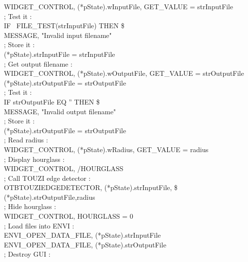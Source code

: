 \begin{scriptsize}
\indent \indent \indent WIDGET\_CONTROL, (*pState).wInputFile, GET\_VALUE = strInputFile\\
\indent \indent \indent ; Test it :\\
\indent \indent \indent IF ~FILE\_TEST(strInputFile) THEN \$\\
\indent \indent \indent \indent MESSAGE, "Invalid input filename"\\
\indent \indent \indent ; Store it :\\
\indent \indent \indent (*pState).strInputFile = strInputFile\\
\indent \indent \indent ; Get output filename :\\
\indent \indent \indent WIDGET\_CONTROL, (*pState).wOutputFile, GET\_VALUE = strOutputFile\\
\indent \indent \indent (*pState).strOutputFile = strOutputFile\\
\indent \indent \indent ; Test it :\\
\indent \indent \indent IF strOutputFile EQ '' THEN \$\\
\indent \indent \indent \indent MESSAGE, "Invalid output filename"\\
\indent \indent \indent ; Store it :\\
\indent \indent \indent (*pState).strOutputFile = strOutputFile\\
\indent \indent \indent ; Read radius :\\
\indent \indent \indent WIDGET\_CONTROL, (*pState).wRadius, GET\_VALUE = radius\\
\indent \indent \indent ; Display hourglass :\\
\indent \indent \indent WIDGET\_CONTROL, /HOURGLASS\\
\indent \indent \indent ; Call TOUZI edge detector :\\
\indent \indent \indent OTBTOUZIEDGEDETECTOR, (*pState).strInputFile, \$ (*pState).strOutputFile,radius\\
\indent \indent \indent ; Hide hourglass :\\
\indent \indent \indent WIDGET\_CONTROL, HOURGLASS = 0\\
\indent \indent \indent ; Load files into ENVI :\\
\indent \indent \indent ENVI\_OPEN\_DATA\_FILE, (*pState).strInputFile\\
\indent \indent \indent ENVI\_OPEN\_DATA\_FILE, (*pState).strOutputFile\\
\indent \indent \indent ; Destroy GUI :\\

\end{scriptsize}
